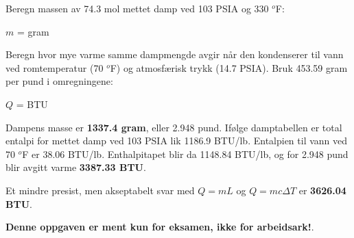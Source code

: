 

Beregn massen av 74.3 mol mettet damp ved 103 PSIA og 330 $^{o}$F:

\vskip 10pt

$m$ = \underbar{\hskip 50pt} gram

\vskip 20pt

Beregn hvor mye varme samme dampmengde avgir når den kondenserer til vann ved romtemperatur (70 $^{o}$F) og atmosfærisk trykk (14.7 PSIA). Bruk 453.59 gram per pund i omregningene:

\vskip 10pt

$Q$ = \underbar{\hskip 50pt} BTU







Dampens masse er {\bf 1337.4 gram}, eller 2.948 pund. Ifølge damptabellen er total entalpi for mettet damp ved 103 PSIA lik 1186.9 BTU/lb. Entalpien til vann ved 70 $^{o}$F er 38.06 BTU/lb. Enthalpitapet blir da 1148.84 BTU/lb, og for 2.948 pund blir avgitt varme {\bf 3387.33 BTU}.

\vskip 10pt

Et mindre presist, men akseptabelt svar med $Q=mL$ og $Q=mc\Delta T$ er {\bf 3626.04 BTU}.







{\bf Denne oppgaven er ment kun for eksamen, ikke for arbeidsark!}.


